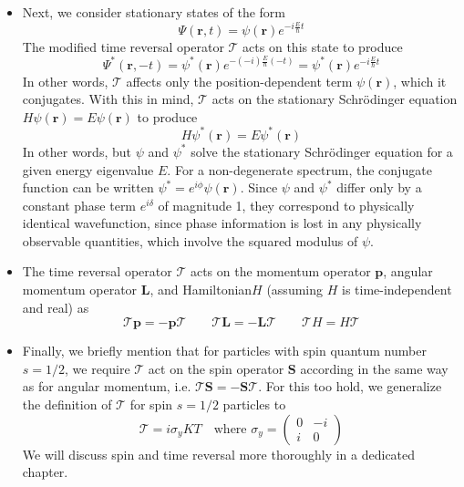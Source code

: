 \documentclass[11pt, a4paper]{article}
\newcommand{\Schro}{Schr\"{o}dinger\xspace}
\newcommand{\Ham}{Hamiltonian\xspace}
\renewcommand{\vec}[1]{\bm{#1}}  %
\renewcommand{\r}{\vec{r}}  %
\newcommand{\T}{\mathcal{T}}  %
\newcommand{\p}{\psi}  %
\renewcommand{\P}{\Psi}  %
\begin{document}
\begin{itemize}
	\item Next, we consider stationary states of the form
	\begin{equation*}
		\P(\r, t) = \p(\r)e^{-i\frac{E}{\hbar}t}
	\end{equation*}
	The modified time reversal operator $ \T $ acts on this state to produce
	\begin{equation*}
		\P^{*}(\r, -t) = \p^{*}(\r)e^{-(-i)\frac{E}{\hbar}(-t)} = \p^{*}(\r)e^{-i\frac{E}{\hbar}t}
	\end{equation*}
	In other words, $ \T $ affects only the position-dependent term $ \p(\r) $, which it conjugates. With this in mind,	$ \T $ acts on the stationary \Schro equation $ H \p(\r) = E\p(\r) $ to produce
	\begin{equation*}
		 H \p^{*}(\r) = E\p^{*}(\r) 
	\end{equation*}
	In other words, but $ \p $ and $ \p^{*} $ solve the stationary \Schro equation for a given energy eigenvalue $ E $. For a non-degenerate spectrum, the conjugate function can be written $ \p^{*} = e^{i\phi}\p(\r) $. Since $ \p $ and $ \p^{*} $ differ only by a constant phase term $ e^{i\delta} $ of magnitude 1, they correspond to physically identical wavefunction, since phase information is lost in any physically observable quantities, which involve the squared modulus of $ \p $.
	
	\item The time reversal operator $ \T $ acts on the momentum operator $ \vec{p} $, angular momentum operator $ \vec{L} $, and \Ham $ H $ (assuming $ H $ is time-independent and real) as
	\begin{equation*}
		\T \vec{p} = - \vec{p} \T \qquad \T \vec{L} = - \vec{L} \T \qquad \T H = H \T
	\end{equation*}
	
	\item Finally, we briefly mention that for particles with spin quantum number $ s = 1/2 $, we require $ \T $ act on the spin operator $ \vec{S} $ according in the same way as for angular momentum, i.e. $ \T \vec{S} = - \vec{S} \T $. For this too hold, we generalize the definition of $ \T $ for spin $ s = 1/2 $ particles to
	\begin{equation*}
		\T = i \sigma_{y} K T \quad \text{where }  \sigma_{y} = 
		\begin{pmatrix}
			0 & - i\\
			i & 0
		\end{pmatrix}
	\end{equation*}
	We will discuss spin and time reversal more thoroughly in a dedicated chapter. 
	

\end{itemize}
\end{document}
